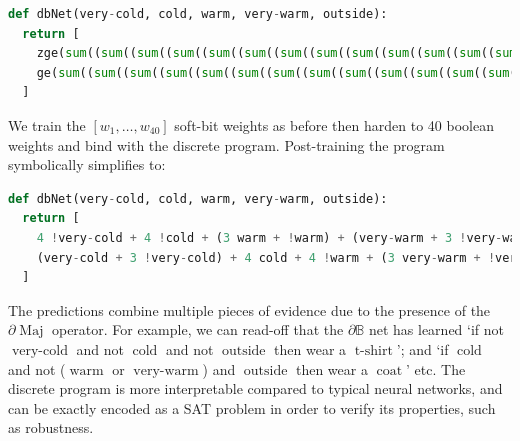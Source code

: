 \documentclass{article} %
\begin{document}
\begin{lstlisting}[language=Python,style=mystyle,frame=single]
def dbNet(very-cold, cold, warm, very-warm, outside):
  return [
    zge(sum((sum((sum((sum((sum((sum((sum((sum((sum((sum((sum((sum((sum((sum((sum((sum((sum((sum((sum((sum((0, not(xor(ne(very-cold, 0), w1)))), not(xor(ne(cold, 0), w2)))), not(xor(ne(warm, 0), w3)))), not(xor(ne(very-warm, 0), w4)))), not(xor(ne(outside, 0), w5)))), not(xor(ne(very-cold, 0), w6)))), not(xor(ne(cold, 0), w7)))), not(xor(ne(warm, 0), w8)))), not(xor(ne(very-warm, 0), w9)))), not(xor(ne(outside, 0), w10)))), not(xor(ne(very-cold, 0), w11)))), not(xor(ne(cold, 0), w12)))), not(xor(ne(warm, 0), w13)))), not(xor(ne(very-warm, 0), w14)))), not(xor(ne(outside, 0), w15)))), not(xor(ne(very-cold, 0), w16)))), not(xor(ne(cold, 0), w17)))), not(xor(ne(warm, 0), w18)))), not(xor(ne(very-warm, 0), w19)))), not(xor(ne(outside, 0), w20)))), 11),
    ge(sum((sum((sum((sum((sum((sum((sum((sum((sum((sum((sum((sum((sum((sum((sum((sum((sum((sum((sum((sum((0, not(xor(ne(very-cold, 0), w21)))), not(xor(ne(cold, 0), w22)))), not(xor(ne(warm, 0), w23)))), not(xor(ne(very-warm, 0), w24)))), not(xor(ne(outside, 0), w25)))), not(xor(ne(very-cold, 0), w26)))), not(xor(ne(cold, 0), w27)))), not(xor(ne(warm, 0), w28)))), not(xor(ne(very-warm, 0), w29)))), not(xor(ne(outside, 0), w30)))), not(xor(ne(very-cold, 0), w31)))), not(xor(ne(cold, 0), w32)))), not(xor(ne(warm, 0), w33)))), not(xor(ne(very-warm, 0), w34)))), not(xor(ne(outside, 0), w35)))), not(xor(ne(very-cold, 0), w36)))), not(xor(ne(cold, 0), w37)))), not(xor(ne(warm, 0), w38)))), not(xor(ne(very-warm, 0), w39)))), not(xor(ne(outside, 0), w40)))), 11)
  ]
\end{lstlisting}
We train the $[w_{1}, \dots, w_{40}]$ soft-bit weights as before then harden to 40 boolean weights and bind with the discrete program. Post-training the program symbolically simplifies to:

\begin{lstlisting}[language=Python,style=mystyle,frame=single]
def dbNet(very-cold, cold, warm, very-warm, outside):
  return [
    4 !very-cold + 4 !cold + (3 warm + !warm) + (very-warm + 3 !very-warm) + (outside + 3 !outside) >= 11,
    (very-cold + 3 !very-cold) + 4 cold + 4 !warm + (3 very-warm + !very-warm) + 2 (outside + !outside) >= 11
  ]
\end{lstlisting}

The predictions combine multiple pieces of evidence due to the presence of the $\partial\!\operatorname{Maj}$ operator. For example, we can read-off that the $\partial\mathbb{B}$ net has learned `if not $\operatorname{very-cold}$ and not $\operatorname{cold}$ and not $\operatorname{outside}$ then wear a $\operatorname{t-shirt}$'; and `if $\operatorname{cold}$ and not ($\operatorname{warm}$ or $\operatorname{very-warm}$) and $\operatorname{outside}$ then wear a $\operatorname{coat}$' etc. The discrete program is more interpretable compared to typical neural networks, and can be exactly encoded as a SAT problem in order to verify its properties, such as robustness.
\end{document}
